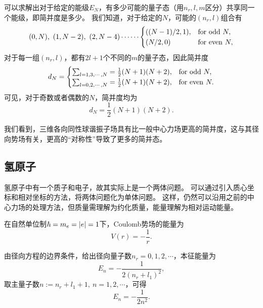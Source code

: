 可以求解出对于给定的能级$E_N$，有多少可能的量子态（用$n_r,l,m$区分）共享同一个能级，即简并度是多少。
我们知道，对于给定的$N$，可能的$(n_r,l)$组合有
\begin{equation}
    (0,N),\ (1,N-2),\ (2,N-4)\cdots\cdots
    \begin{cases}
        ((N-1)/2, 1),   & \rm{for\ odd\ }N, \\
        (N/2, 0)        & \rm{for\ even\ }N, \\
    \end{cases}
\end{equation}
对于每一组$(n_r,l)$，都有$2l+1$个不同的$m$的量子态，因此简并度
\begin{equation}
    d_N =
    \begin{cases}
        \sum_{l=1,3,\cdots,N} = \frac12 (N+1)(N+2), & \rm{for\ odd\ }N, \\
        \sum_{l=0,2,\cdots,N} = \frac12 (N+1)(N+2), & \rm{for\ even\ }N. \\
    \end{cases}
\end{equation}
可见，对于奇数或者偶数的$N$，简并度均为
\begin{equation}
    d_N = \frac12 (N+1)(N+2).
\end{equation}

我们看到，三维各向同性球谐振子场具有比一般中心力场更高的简并度，这与其径向势场有关，更高的“对称性”导致了更多的简并态。

\subsection{氢原子}
\label{subsec:cf_hydrogen}

氢原子中有一个质子和电子，故其实际上是一个两体问题。
可以通过引入质心坐标和相对坐标的方法，将两体问题化为单体问题。
这样，仍然可以沿用之前的中心力场的处理方法，但质量需理解为约化质量，能量理解为相对运动能量。

在自然单位制$\hbar=m_e=\abs{e}=1$下，Coulomb势场的能量为
\begin{equation}
    V(r) = -\frac{1}{r}.
\end{equation}

由径向方程的边界条件，给出径向量子数$n_r=0,1,2,\cdots$，本征能量为
\begin{equation}
    E_n = -\frac{1}{2(n_r+l_1)^2},
\end{equation}
取主量子数$n:=n_r+l_1+1,\ n=1,2,\cdots$，可得
\begin{equation}
    E_n = -\frac{1}{2n^2}.
\end{equation}

